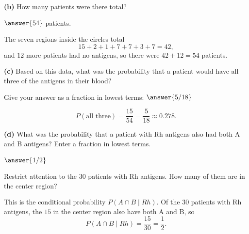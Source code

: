 \documentclass[12pt]{ximera}
\begin{document}
\begin{problem}
\begin{prompt}
\textbf{(b)} How many patients were there total?

$\answer{54}$ patients.

\begin{feedback}
The seven regions inside the circles total
\[ 15+2+1+7+7+3+7=42, \]
and $12$ more patients had no antigens, so there were $42+12=54$ patients.
\end{feedback}
\end{prompt}

\begin{prompt}
\textbf{(c)} Based on this data, what was the probability that a patient would have
all three of the antigens in their blood?

Give your answer as a fraction in lowest terms: $\answer{5/18}$

\begin{feedback}
\[
P(\text{all three})=\frac{15}{54}=\frac{5}{18}\approx 0.278.
\]
\end{feedback}
\end{prompt}

\begin{prompt}
\textbf{(d)} What was the probability that a patient with Rh antigens also had both A
and B antigens? Enter a fraction in lowest terms.

$\answer{1/2}$

\begin{hint}
Restrict attention to the $30$ patients with Rh antigens. How many of them are in the
center region?
\end{hint}

\begin{feedback}
This is the conditional probability $P(A\cap B\mid Rh)$. Of the $30$ patients with Rh
antigens, the $15$ in the center region also have both A and B, so
\[ P(A\cap B\mid Rh)=\frac{15}{30}=\frac12. \]
\end{feedback}
\end{prompt}
\end{problem}
\end{document}

